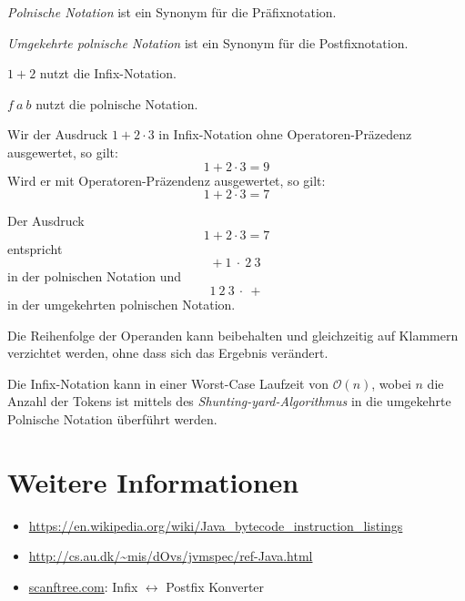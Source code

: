 \textit{Polnische Notation} ist ein Synonym für die Präfixnotation.

\textit{Umgekehrte polnische Notation} ist ein Synonym für die Postfixnotation.

\begin{beispiel}
    \begin{bspenum}
        \item $1 + 2$ nutzt die Infix-Notation.
        \item $f\ a\ b$ nutzt die polnische Notation.
        \item Wir der Ausdruck $1 + 2 \cdot 3$ in Infix-Notation ohne Operatoren-Präzedenz
              ausgewertet, so gilt: 
              \[1 + 2 \cdot 3 = 9\]
              Wird er mit Operatoren-Präzendenz ausgewertet, so gilt:
              \[1 + 2 \cdot 3 = 7\]
        \item Der Ausdruck
              \[1 + 2 \cdot 3 = 7\]
              entspricht
              \[+\ 1\ \cdot\ 2\ 3\]
              in der polnischen Notation und
              \[1\ 2\ 3\ \cdot\ +\]
              in der umgekehrten polnischen Notation.
    \end{bspenum}
\end{beispiel}

\begin{bemerkung}
    \begin{bemenum}
        \item Die Reihenfolge der Operanden kann beibehalten und gleichzeitig
              auf Klammern verzichtet werden, ohne dass sich das Ergebnis 
              verändert.
        \item Die Infix-Notation kann in einer Worst-Case Laufzeit von $\mathcal{O}(n)$,
              wobei $n$ die Anzahl der Tokens ist mittels des
              \textit{Shunting-yard-Algorithmus} in
              die umgekehrte Polnische Notation überführt werden.
    \end{bemenum}
\end{bemerkung}

\section{Weitere Informationen}
\begin{itemize}
    \item \url{https://en.wikipedia.org/wiki/Java_bytecode_instruction_listings}
    \item \url{http://cs.au.dk/~mis/dOvs/jvmspec/ref-Java.html}
    \item \href{http://scanftree.com/Data_Structure/prefix-postfix-infix-online-converter}{scanftree.com}:
          Infix $\leftrightarrow$ Postfix Konverter
\end{itemize}
